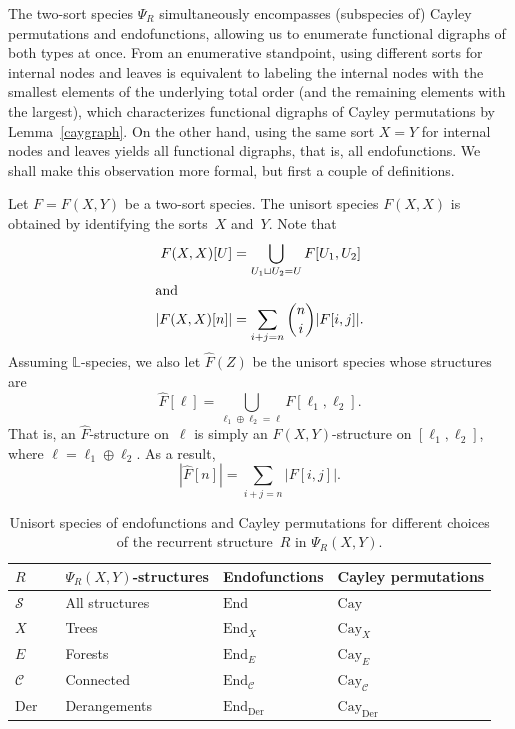 \documentclass[a4paper,11pt,UKenglish]{article}
\newcommand{\LL}{\mathbb{L}}
\newcommand{\Set}{E}
\newcommand{\Sym}{\mathcal{S}}
\newcommand{\End}{\mathrm{End}}
\newcommand{\Cyc}{\mathcal{C}}
\newcommand{\Der}{\mathrm{Der}}
\newcommand{\Cay}{\mathrm{Cay}}
\theoremstyle{definition}
\begin{document}
The two-sort species $\Psi_R$ simultaneously encompasses (subspecies
of) Cayley permutations and endofunctions, allowing us to enumerate
functional digraphs of both types at once. From an enumerative
standpoint, using different sorts for internal nodes and leaves
is equivalent to labeling the internal nodes with the smallest
elements of the underlying total order (and the remaining elements
with the largest), which characterizes functional digraphs of Cayley
permutations by Lemma~\ref{caygraph}. On the other hand, using
the same sort $X=Y$ for internal nodes and leaves yields all
functional digraphs, that is, all endofunctions.
We shall make this observation more formal, but first a couple of
definitions.

Let $F=F(X,Y)$ be a two-sort species. The unisort species $F(X,X)$
is obtained by identifying the sorts~$X$ and~$Y$. Note that
\begin{align}
F(X,X)[U] &= \bigcup_{U_1\sqcup U_2=U}F[U_1,U_2]\label{def_FXX}\\
\shortintertext{and}
|F(X,X)[n]|
&=\sum_{i+j=n}\binom{n}{i}|F[i,j]|.\label{eq_FXX}
\end{align}
Assuming $\LL$-species, we also let $\widehat{F}(Z)$ be the unisort
species whose structures are
\begin{equation}\label{def_HATF}
\widehat{F}[\ell]=\bigcup_{\ell_1\oplus \ell_2=\ell}F[\ell_1,\ell_2].
\end{equation}
That is, an $\widehat{F}$-structure on~$\ell$ is simply an
$F(X,Y)$-structure on $[\ell_1,\ell_2]$, where
$\ell=\ell_1\oplus\ell_2$.
As a result,
\begin{equation}\label{eq_HATF}
|\widehat{F}[n]|
=\sum_{i+j=n}|F[i,j]|.
\end{equation}
\begin{table}
\centering
\renewcommand{\arraystretch}{1.25}
\begin{tabular}{llll}
$R$         & $\Psi_R(X,Y)$-structures       & Endofunctions & Cayley permutations \\
\toprule
$\Sym$      & All structures                 & $\End$        & $\Cay$              \\
$X$         & Trees                          & $\End_{X}$    & $\Cay_{X}$          \\
$\Set$      & Forests                        & $\End_{\Set}$ & $\Cay_{\Set}$       \\
$\Cyc$      & Connected                      & $\End_{\Cyc}$ & $\Cay_{\Cyc}$       \\
$\Der\quad$ & Derangements                   & $\End_{\Der}$ & $\Cay_{\Der}$
\end{tabular}
\caption{Unisort species of endofunctions and Cayley permutations
for different choices of the recurrent structure~$R$ in
$\Psi_R(X,Y)$.}\label{table_psiR}
\end{table}
\end{document}
